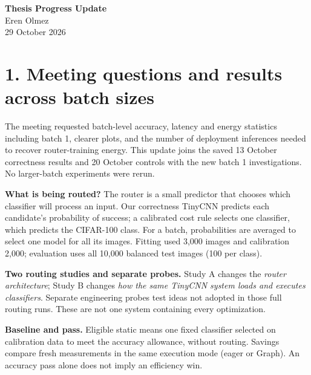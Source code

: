 \documentclass[10pt,a4paper]{article}
\newcommand{\heading}[1]{\section*{\color{navy}#1}}
\begin{document}
\begin{center}
{\Large\bfseries\color{navy}Thesis Progress Update}\\[3 pt]
{Eren Olmez}\\{29 October 2026}
\end{center}\vspace{-8 pt}
\heading{1. Meeting questions and results across batch sizes}
The meeting requested batch-level accuracy, latency and energy statistics including batch 1, clearer plots, and the number of deployment inferences needed to recover router-training energy. This update joins the saved 13 October correctness results and 20 October controls with the new batch 1 investigations. No larger-batch experiments were rerun.

\textbf{What is being routed?} The router is a small predictor that chooses which classifier will process an input. Our correctness TinyCNN predicts each candidate's probability of success; a calibrated cost rule selects one classifier, which predicts the CIFAR-100 class. For a batch, probabilities are averaged to select one model for all its images. Fitting used 3,000 images and calibration 2,000; evaluation uses all 10,000 balanced test images (100 per class).

\textbf{Two routing studies and separate probes.} Study A changes the \emph{router architecture}; Study B changes \emph{how the same TinyCNN system loads and executes classifiers}. Separate engineering probes test ideas not adopted in those full routing runs. These are not one system containing every optimization.

\textbf{Baseline and pass.} Eligible static means one fixed classifier selected on calibration data to meet the accuracy allowance, without routing. Savings compare fresh measurements in the same execution mode (eager or Graph). An accuracy pass alone does not imply an efficiency win.
\end{document}
